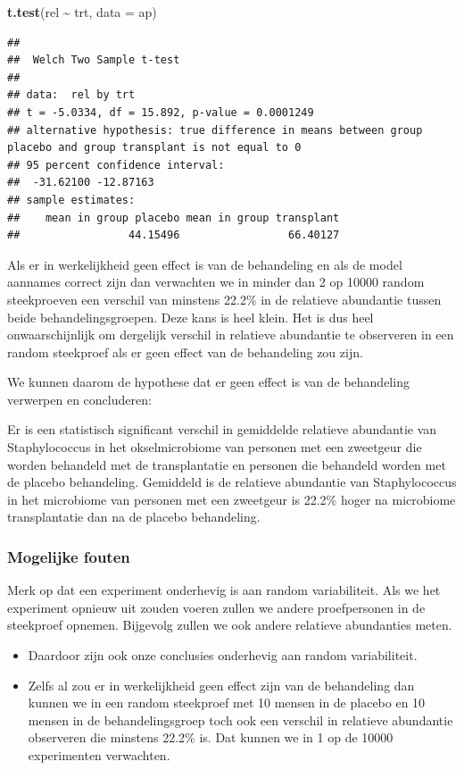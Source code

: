\documentclass[
  12pt,dutch]{book}
\newenvironment{Shaded}{\begin{snugshade}}{\end{snugshade}}
\newcommand{\AttributeTok}[1]{\textcolor[rgb]{0.13,0.29,0.53}{#1}}
\newcommand{\FunctionTok}[1]{\textcolor[rgb]{0.13,0.29,0.53}{\textbf{#1}}}
\newcommand{\NormalTok}[1]{#1}
\newcommand{\SpecialCharTok}[1]{\textcolor[rgb]{0.81,0.36,0.00}{\textbf{#1}}}
\theoremstyle{definition}
\theoremstyle{definition}
\theoremstyle{definition}
\theoremstyle{definition}
\theoremstyle{remark}
\begin{document}
\begin{Shaded}
\begin{Highlighting}[]
\FunctionTok{t.test}\NormalTok{(rel }\SpecialCharTok{\textasciitilde{}}\NormalTok{ trt, }\AttributeTok{data =}\NormalTok{ ap)}
\end{Highlighting}
\end{Shaded}

\begin{verbatim}
## 
##  Welch Two Sample t-test
## 
## data:  rel by trt
## t = -5.0334, df = 15.892, p-value = 0.0001249
## alternative hypothesis: true difference in means between group placebo and group transplant is not equal to 0
## 95 percent confidence interval:
##  -31.62100 -12.87163
## sample estimates:
##    mean in group placebo mean in group transplant 
##                 44.15496                 66.40127
\end{verbatim}

Als er in werkelijkheid geen effect is van de behandeling en als de model aannames correct zijn dan verwachten we in minder dan 2 op 10000 random steekproeven een verschil van minstens 22.2\% in de relatieve abundantie tussen beide behandelingsgroepen.
Deze kans is heel klein. Het is dus heel onwaarschijnlijk om dergelijk verschil in relatieve abundantie te observeren in een random steekproef als er geen effect van de behandeling zou zijn.

We kunnen daarom de hypothese dat er geen effect is van de behandeling verwerpen en concluderen:

Er is een statistisch significant verschil in gemiddelde relatieve abundantie van Staphylococcus in het okselmicrobiome van personen met een zweetgeur die worden behandeld met de transplantatie en personen die behandeld worden met de placebo behandeling.
Gemiddeld is de relatieve abundantie van Staphylococcus in het microbiome van personen met een zweetgeur is 22.2\% hoger na microbiome transplantatie dan na de placebo behandeling.

\subsubsection{Mogelijke fouten}\label{mogelijke-fouten}

Merk op dat een experiment onderhevig is aan random variabiliteit. Als we het experiment opnieuw uit zouden voeren zullen we andere proefpersonen in de steekproef opnemen. Bijgevolg zullen we ook andere relatieve abundanties meten.

\begin{itemize}
\item
  Daardoor zijn ook onze conclusies onderhevig aan random variabiliteit.
\item
  Zelfs al zou er in werkelijkheid geen effect zijn van de behandeling dan kunnen we in een random steekproef met 10 mensen in de placebo en 10 mensen in de behandelingsgroep toch ook een verschil in relatieve abundantie observeren die minstens 22.2\% is. Dat kunnen we in 1 op de 10000 experimenten verwachten.
\end{itemize}
\end{document}
